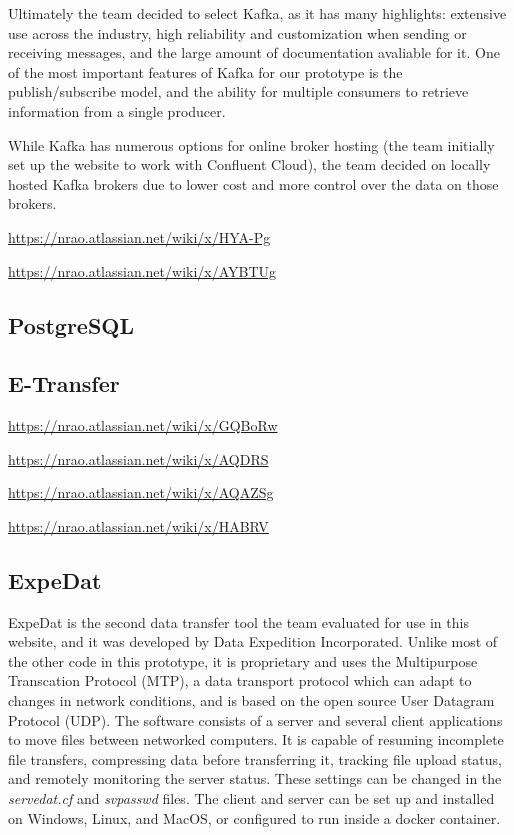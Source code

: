 \documentclass[12pt]{article}
\begin{document}
  Ultimately the team decided to select Kafka, as it has many highlights: extensive use across the industry, high reliability and customization when sending or receiving messages, and the large amount of documentation avaliable for it. One of the most important features of Kafka for our prototype is the publish/subscribe model, and the ability for multiple consumers to retrieve information from a single producer. 
  
  While Kafka has numerous options for online broker hosting (the team initially set up the website to work with Confluent Cloud), the team decided on locally hosted Kafka brokers due to lower cost and more control over the data on those brokers.

\url{https://nrao.atlassian.net/wiki/x/HYA-Pg}

\url{https://nrao.atlassian.net/wiki/x/AYBTUg}

\subsection*{PostgreSQL}


\subsection*{E-Transfer}

\url{https://nrao.atlassian.net/wiki/x/GQBoRw}

\url{https://nrao.atlassian.net/wiki/x/AQDRS}

\url{https://nrao.atlassian.net/wiki/x/AQAZSg}

\url{https://nrao.atlassian.net/wiki/x/HABRV}

\subsection*{ExpeDat}

  ExpeDat is the second data transfer tool the team evaluated for use in this website, and it was developed by Data Expedition Incorporated. Unlike most of the other code in this prototype, it is proprietary and uses the Multipurpose Transcation Protocol (MTP), a data transport protocol which can adapt to changes in network conditions, and is based on the open source User Datagram Protocol (UDP). The software consists of a server and several client applications to move files between networked computers. It is capable of resuming incomplete file transfers, compressing data before transferring it, tracking file upload status, and remotely monitoring the server status. These settings can be changed in the \textit{servedat.cf} and \textit{svpasswd} files. The client and server can be set up and installed on Windows, Linux, and MacOS, or configured to run inside a docker container.
\end{document}
